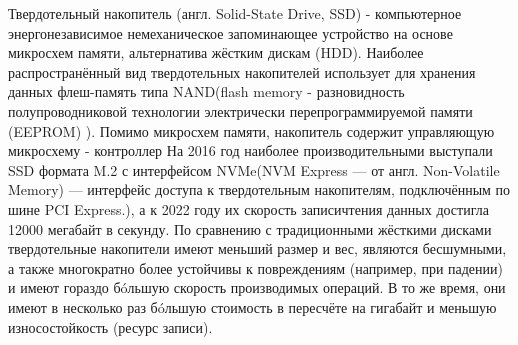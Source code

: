 Твердотельный накопитель (англ. Solid-State Drive, SSD) - компьютерное энергонезависимое немеханическое запоминающее устройство на основе микросхем памяти, альтернатива жёстким дискам (HDD). Наиболее распространённый вид твердотельных накопителей использует для хранения данных флеш-память типа NAND(flash memory - разновидность полупроводниковой технологии электрически перепрограммируемой памяти (EEPROM) ). Помимо микросхем памяти, накопитель содержит управляющую микросхему - контроллер 
На 2016 год наиболее производительными выступали SSD формата M.2 с интерфейсом NVMe(NVM Express --- от англ. Non-Volatile Memory) --- интерфейс доступа к твердотельным накопителям, подключённым по шине PCI Express.), а к 2022 году их скорость записи\/чтения данных достигла 12000 мегабайт в секунду.
По сравнению с традиционными жёсткими дисками твердотельные накопители имеют меньший размер и вес, являются бесшумными, а также многократно более устойчивы к повреждениям (например, при падении) и имеют гораздо бóльшую скорость производимых операций. В то же время, они имеют в несколько раз бóльшую стоимость в пересчёте на гигабайт и меньшую износостойкость (ресурс записи).


